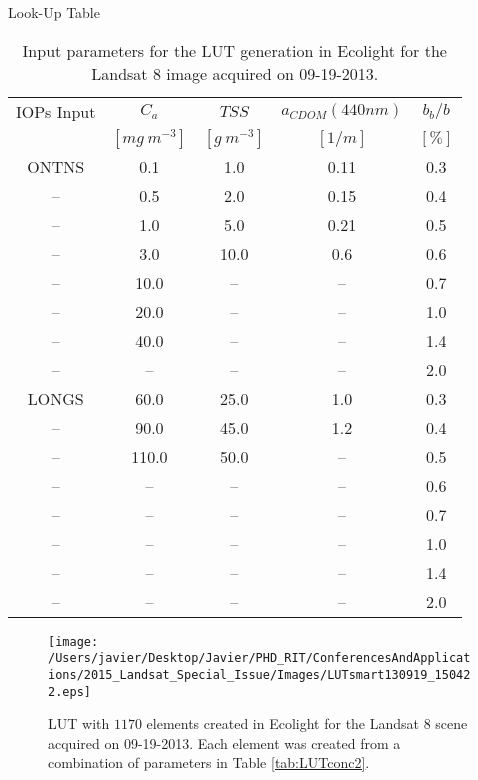 \documentclass{beamer}
\begin{document}
\begin{frame}{}
\begin{columns}[t]
\begin{column}{.32\linewidth}
\begin{block}{Look-Up Table}
\begin{table}[htb]
\caption{Input parameters for the LUT generation in Ecolight for the Landsat 8 image acquired on 09-19-2013. \label{tab:LUTconc2}} 
\vspace{.07cm}
\scriptsize
\centering
    \begin{tabular}{c|c|c|c|c}
    \hline \hline
            IOPs Input & \bfseries{$C_a$} & \bfseries{$TSS$} & \bfseries{$a_{CDOM}(440nm)$} & \bfseries{$b_b/b$}    \\
                   & $[mg~m^{-3}]$        & $[g~m^{-3}]$       &  $[1/m]$           & $[\%]$            \\ \hline \hline
ONTNS   &  0.1    & 1.0     &  0.11   &  0.3  \\
--    &  0.5    & 2.0     &  0.15   &  0.4  \\
--      &  1.0    & 5.0     &  0.21   &  0.5  \\
--      &  3.0    & 10.0    &  0.6    &  0.6  \\ 
--    &  10.0     & --    &  --   &  0.7  \\  
--      &  20.0     & --    &  --   &  1.0  \\  
--      &  40.0     & --    &  --   &  1.4  \\
--      &  --       & --    &  --   &  2.0  \\ \hline

LONGS   &  60.0   & 25.0    &  1.0    &  0.3  \\
--      &  90.0   & 45.0    &  1.2    &  0.4  \\
--      &  110.0  & 50.0    &  --     &  0.5  \\
--      &  --     & --      &  --     &  0.6  \\  
--      &  --     & --      &  --     &  0.7  \\  
--      &  --     & --      &  --     &  1.0  \\   
--      &  --     & --      &  --     &  1.4  \\  
--      &  --     & --      &  --     &  2.0  \\  \hline \hline
    \end{tabular}
  \end{table}


\begin{figure}[htb]
    \centering
      \texttt{[image: /Users/javier/Desktop/Javier/PHD\_RIT/ConferencesAndApplications/2015\_Landsat\_Special\_Issue/Images/LUTsmart130919\_150422.eps]}
      \caption{LUT with $1170$ elements created in Ecolight for the Landsat 8 scene acquired on 09-19-2013. Each element was created from a combination of parameters in Table \autoref{tab:LUTconc2}.}
      \label{fig:LUT}


\end{figure}
\end{block}
\end{column}
\end{columns}
\end{frame}
\end{document}
